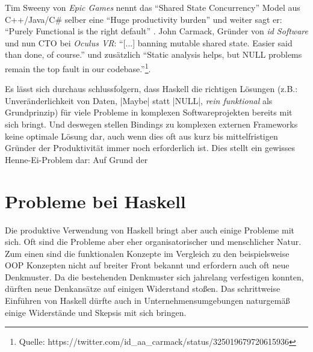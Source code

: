 

Tim Sweeny von \textit{Epic Games} nennt das "`Shared State Concurrency"' Model aus C++/Java/C\# selber eine "`Huge productivity burden"' und weiter sagt er: "`Purely Functional is the right default"' \parencite[Vgl.][Seite 42 u. Seite 56]{Sweeney2006}. John Carmack, Gründer von \textit{id Software} und nun CTO bei \textit{Oculus VR}: "`[...] banning mutable shared state. Easier said than done, of course."' und zusätzlich "`Static analysis helps, but NULL problems remain the top fault in our codebase."'\footnote{Quelle: https://twitter.com/id\_aa\_carmack/status/325019679720615936}.

Es lässt sich durchaus schlussfolgern, dass Haskell die richtigen Lösungen (z.B.: Unveränderlichkeit von Daten, |Maybe| statt |NULL|, \textit{rein funktional} als Grundprinzip) für viele Probleme in komplexen Softwareprojekten bereits mit sich bringt. Und deswegen stellen Bindings zu komplexen externen Frameworks keine optimale Lösung dar, auch wenn dies oft aus kurz bis mittelfristigen Gründer der Produktivität immer noch erforderlich ist. Dies stellt ein gewisses Henne-Ei-Problem dar: Auf Grund der 

\section{Probleme bei Haskell}\label{sec:probleme-haskell}

Die produktive Verwendung von Haskell bringt aber auch einige Probleme mit sich. Oft sind die Probleme aber eher organisatorischer und menschlicher Natur. Zum einen sind die funktionalen Konzepte im Vergleich zu den beispielsweise OOP Konzepten nicht auf breiter Front bekannt und erfordern auch oft neue Denkmuster. Da die bestehenden Denkmuster sich jahrelang verfestigen konnten, dürften neue Denkansätze auf einigen Widerstand stoßen. Das schrittweise Einführen von Haskell dürfte auch in Unternehmensumgebungen naturgemäß einige Widerstände und Skepsis mit sich bringen.

